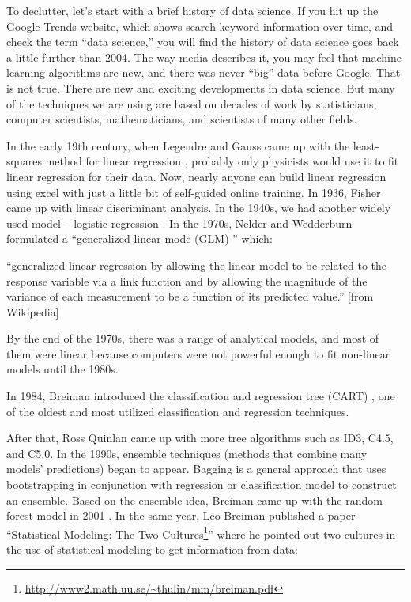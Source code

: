 \documentclass[12pt,]{krantz}
\renewenvironment{quote}{\begin{VF}}{\end{VF}}
\renewcommand{\href}[2]{#2\footnote{\url{#1}}}
\begin{document}
To declutter, let's start with a brief history of data science. If you hit up the Google Trends website, which shows search keyword information over time, and check the term ``data science,'' you will find the history of data science goes back a little further than 2004. The way media describes it, you may feel that machine learning algorithms are new, and there was never ``big'' data before Google. That is not true. There are new and exciting developments in data science. But many of the techniques we are using are based on decades of work by statisticians, computer scientists, mathematicians, and scientists of many other fields.

In the early 19th century, when Legendre and Gauss came up with the least-squares method for linear regression , probably only physicists would use it to fit linear regression for their data. Now, nearly anyone can build linear regression using excel with just a little bit of self-guided online training. In 1936, Fisher came up with linear discriminant analysis. In the 1940s, we had another widely used model -- logistic regression . In the 1970s, Nelder and Wedderburn formulated a ``generalized linear mode (GLM)  '' which:

\begin{quote}
``generalized linear regression by allowing the linear model to be related to the response variable via a link function and by allowing the magnitude of the variance of each measurement to be a function of its predicted value.'' {[}from Wikipedia{]}
\end{quote}

By the end of the 1970s, there was a range of analytical models, and most of them were linear because computers were not powerful enough to fit non-linear models until the 1980s.

In 1984, Breiman introduced the classification and regression tree (CART)  , one of the oldest and most utilized classification and regression techniques\citep{Breiman1984}.

After that, Ross Quinlan came up with more tree algorithms such as ID3, C4.5, and C5.0. In the 1990s, ensemble techniques (methods that combine many models' predictions) began to appear. Bagging is a general approach that uses bootstrapping in conjunction with regression or classification model to construct an ensemble. Based on the ensemble idea, Breiman came up with the random forest  model in 2001 \citep{Breiman2001}. In the same year, Leo Breiman published a paper ``\href{http://www2.math.uu.se/~thulin/mm/breiman.pdf}{Statistical Modeling: The Two Cultures}'' \citep{Breiman2001TwoCulture} where he pointed out two cultures in the use of statistical modeling to get information from data:
\end{document}
